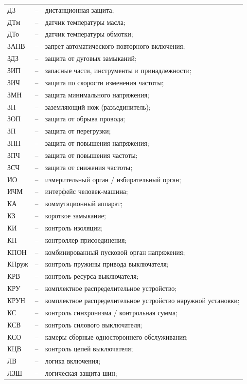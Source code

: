 \begin{longtable}{>{\raggedright\arraybackslash}m{2cm}>{\raggedright\arraybackslash}m{0.5cm}>{\raggedright\arraybackslash}m{20cm}}
ДЗ & -- & дистанционная защита; \\
ДТм & -- & датчик температуры масла; \\
ДТо & -- & датчик температуры обмотки; \\
ЗАПВ & -- & запрет автоматического повторного включения; \\
ЗДЗ & -- & защита от дуговых замыканий; \\
ЗИП & -- & запасные части, инструменты и принадлежности; \\
ЗИЧ & -- & защита по скорости изменения частоты; \\
ЗМН & -- & защита минимального напряжения; \\
ЗН & -- & заземляющий нож (разъединитель); \\
ЗОП & -- & защита от обрыва провода; \\
ЗП & -- & защита от перегрузки; \\
ЗПН & -- & защита от повышения напряжения; \\
ЗПЧ & -- & защита от повышения частоты; \\
ЗСЧ & -- & защита от снижения частоты; \\
ИО & -- & измерительный орган / избирательный орган; \\
ИЧМ & -- & интерфейс человек-машина; \\
КА & -- & коммутационный аппарат; \\
КЗ & -- & короткое замыкание; \\
КИ & -- & контроль изоляции; \\
КП & -- & контроллер присоединения; \\
КПОН & -- & комбинированный пусковой орган напряжения; \\
КПруж & -- & контроль пружины привода выключателя; \\
КРВ & -- & контроль ресурса выключателя; \\
КРУ & -- & комплектное распределительное устройство; \\
КРУН & -- & комплектное распределительное устройство наружной установки; \\
КС & -- & контроль синхронизма / контрольная сумма; \\
КСВ & -- & контроль силового выключателя; \\
КСО & -- & камеры сборные одностороннего обслуживания; \\
КЦВ & -- & контроль цепей выключателя; \\
ЛВ & -- & логика включения; \\
ЛЗШ & -- & логическая защита шин; \\

\end{longtable}
